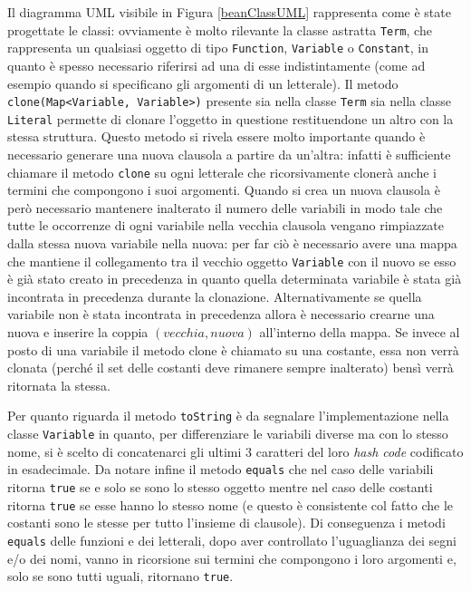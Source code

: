 \documentclass[a4paper,11pt]{article}
\begin{document}
Il diagramma UML visibile in Figura \ref{beanClassUML} rappresenta come è state progettate le classi: ovviamente è molto rilevante la classe astratta \texttt{Term}, che rappresenta un qualsiasi oggetto di tipo \texttt{Function}, \texttt{Variable} o \texttt{Constant}, in quanto è spesso necessario riferirsi ad una di esse indistintamente (come ad esempio quando si specificano gli argomenti di un letterale). Il metodo \texttt{clone(Map<Variable, Variable>)} presente sia nella classe \texttt{Term} sia nella classe \texttt{Literal} permette di clonare l'oggetto in questione restituendone un altro con la stessa struttura. Questo metodo si rivela essere molto importante quando è necessario generare una nuova clausola a partire da un'altra: infatti è sufficiente chiamare il metodo \texttt{clone} su ogni letterale che ricorsivamente clonerà anche i termini che compongono i suoi argomenti. Quando si crea un nuova clausola è però necessario mantenere inalterato il numero delle variabili in modo tale che tutte le occorrenze di ogni variabile nella vecchia clausola vengano rimpiazzate dalla stessa nuova variabile nella nuova: per far ciò è necessario avere una mappa che mantiene il collegamento tra il vecchio oggetto \texttt{Variable} con il nuovo se esso è già stato creato in precedenza in quanto quella determinata variabile è stata già incontrata in precedenza durante la clonazione. Alternativamente se quella variabile non è stata incontrata in precedenza allora è necessario crearne una nuova e inserire la coppia $(vecchia, nuova)$ all'interno della mappa. Se invece al posto di una variabile il metodo clone è chiamato su una costante, essa non verrà clonata (perché il set delle costanti deve rimanere sempre inalterato) bensì verrà ritornata la stessa.\par
Per quanto riguarda il metodo \texttt{toString} è da segnalare l'implementazione nella classe \texttt{Variable} in quanto, per differenziare le variabili diverse ma con lo stesso nome, si è scelto di concatenarci gli ultimi 3 caratteri del loro \emph{hash code} codificato in esadecimale.
Da notare infine il metodo \texttt{equals} che nel caso delle variabili ritorna \texttt{true} se e solo se sono lo stesso oggetto mentre nel caso delle costanti ritorna \texttt{true} se esse hanno lo stesso nome (e questo è consistente col fatto che le costanti sono le stesse per tutto l'insieme di clausole). Di conseguenza i metodi \texttt{equals} delle funzioni e dei letterali, dopo aver controllato l'uguaglianza dei segni e/o dei nomi, vanno in ricorsione sui termini che compongono i loro argomenti e, solo se sono tutti uguali, ritornano \texttt{true}.
\end{document}
